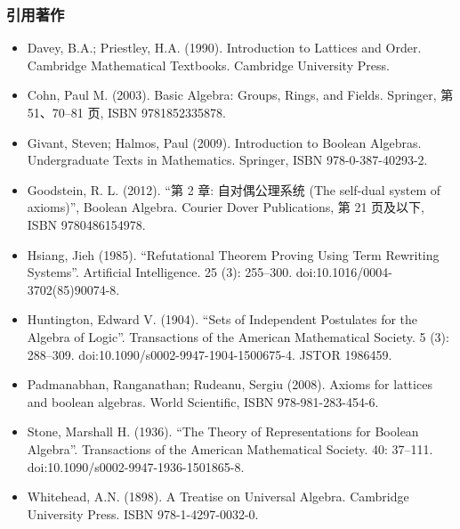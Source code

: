 \subsubsection{引用著作}
\begin{itemize}
\item Davey, B.A.; Priestley, H.A. (1990). Introduction to Lattices and Order. Cambridge Mathematical Textbooks. Cambridge University Press.
\item Cohn, Paul M. (2003). Basic Algebra: Groups, Rings, and Fields. Springer, 第 51、70–81 页, ISBN 9781852335878.
\item Givant, Steven; Halmos, Paul (2009). Introduction to Boolean Algebras. Undergraduate Texts in Mathematics. Springer, ISBN 978-0-387-40293-2.
\item Goodstein, R. L. (2012). “第 2 章: 自对偶公理系统 (The self-dual system of axioms)”, Boolean Algebra. Courier Dover Publications, 第 21 页及以下, ISBN 9780486154978.
\item Hsiang, Jieh (1985). “Refutational Theorem Proving Using Term Rewriting Systems”. Artificial Intelligence. 25 (3): 255–300. doi:10.1016/0004-3702(85)90074-8.
\item Huntington, Edward V. (1904). “Sets of Independent Postulates for the Algebra of Logic”. Transactions of the American Mathematical Society. 5 (3): 288–309. doi:10.1090/s0002-9947-1904-1500675-4. JSTOR 1986459.
\item Padmanabhan, Ranganathan; Rudeanu, Sergiu (2008). Axioms for lattices and boolean algebras. World Scientific, ISBN 978-981-283-454-6.
\item Stone, Marshall H. (1936). “The Theory of Representations for Boolean Algebra”. Transactions of the American Mathematical Society. 40: 37–111. doi:10.1090/s0002-9947-1936-1501865-8.
\item Whitehead, A.N. (1898). A Treatise on Universal Algebra. Cambridge University Press. ISBN 978-1-4297-0032-0.
\end{itemize}
